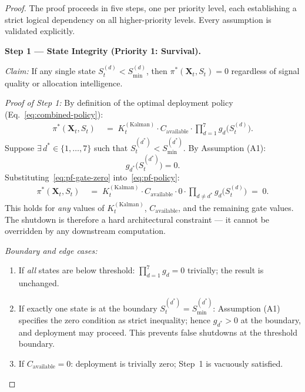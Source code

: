 \documentclass[12pt,openany]{book}
\numberwithin{equation}{chapter}
\theoremstyle{plain}
\theoremstyle{definition}
\theoremstyle{remark}
\def\mathcal#1{#1}%
\begin{document}
\begin{proof}
The proof proceeds in five steps, one per priority level, each
establishing a strict logical dependency on all higher-priority
levels.  Every assumption is validated explicitly.

\medskip
\noindent\textbf{Step 1 — State Integrity (Priority 1: Survival).}

\noindent\textit{Claim:} If any single state $\mathcal{S}_t^{(d)}
< \mathcal{S}_{\min}^{(d)}$, then $\pi^*(\mathbf{X}_t, S_t) = 0$
regardless of signal quality or allocation intelligence.

\noindent\textit{Proof of Step 1:}
By definition of the optimal deployment policy
(Eq.~\ref{eq:combined-policy}):
\begin{align}
  \pi^*(\mathbf{X}_t, S_t)
  &\;=\; K_t^{(\mathrm{Kalman})} \cdot C_{\mathrm{available}}
        \cdot \prod_{d=1}^{7} g_d\!\bigl(\mathcal{S}_t^{(d)}\bigr).
  \label{eq:pf-policy}
\end{align}
Suppose $\exists\, d^* \in \{1,\dots,7\}$ such that
$\mathcal{S}_t^{(d^*)} < \mathcal{S}_{\min}^{(d^*)}$.
By Assumption (A1):
\begin{equation}
  g_{d^*}\!\bigl(\mathcal{S}_t^{(d^*)}\bigr) = 0.
  \label{eq:pf-gate-zero}
\end{equation}
Substituting~\eqref{eq:pf-gate-zero} into~\eqref{eq:pf-policy}:
\begin{align}
  \pi^*(\mathbf{X}_t, S_t)
  &\;=\; K_t^{(\mathrm{Kalman})} \cdot C_{\mathrm{available}}
        \cdot 0 \cdot \prod_{d \neq d^*} g_d\!\bigl(\mathcal{S}_t^{(d)}\bigr)
  \;=\; 0.
  \label{eq:pf-zero-deploy}
\end{align}
This holds for \emph{any} values of
$K_t^{(\mathrm{Kalman})}$, $C_{\mathrm{available}}$, and the
remaining gate values.  The shutdown is therefore a hard
architectural constraint — it cannot be overridden by any
downstream computation.

\noindent\textit{Boundary and edge cases:}
\begin{enumerate}
  \item If \emph{all} states are below threshold:
        $\prod_{d=1}^7 g_d = 0$ trivially; the result is unchanged.
  \item If exactly one state is at the boundary
        $\mathcal{S}_t^{(d^*)} = \mathcal{S}_{\min}^{(d^*)}$:
        Assumption (A1) specifies the zero condition as strict
        inequality; hence $g_{d^*}>0$ at the boundary, and
        deployment may proceed.  This prevents false shutdowns at
        the threshold boundary.
  \item If $C_{\mathrm{available}} = 0$: deployment is trivially
        zero; Step~1 is vacuously satisfied.
\end{enumerate}


\end{proof}
\end{document}
